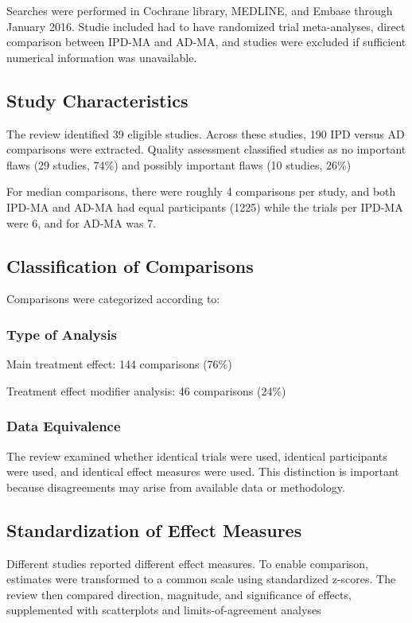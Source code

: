 \documentclass[11pt]{article}
\begin{document}
Searches were performed in Cochrane library, MEDLINE, and Embase through January 2016. Studie included had to have randomized trial meta-analyses, direct comparison between IPD-MA and AD-MA, and studies were excluded if sufficient numerical information was unavailable.

\subsection*{Study Characteristics}

The review identified 39 eligible studies. Across these studies, 190 IPD versus AD comparisons were extracted. Quality assessment classified studies as no important flaws (29 studies, 74\%) and possibly important flaws (10 studies, 26\%)

For median comparisons, there were roughly 4 comparisons per study, and both IPD-MA and AD-MA had equal participants (1225) while the trials per IPD-MA were 6, and for AD-MA was 7.

\subsection*{Classification of Comparisons}

Comparisons were categorized according to:

\subsubsection*{Type of Analysis}

Main treatment effect: 144 comparisons (76\%)

Treatment effect modifier analysis: 46 comparisons (24\%)

\subsubsection*{Data Equivalence}

The review examined whether identical trials were used, identical participants were used, and identical effect measures were used. This distinction is important because disagreements may arise from available data or methodology.

\subsection*{Standardization of Effect Measures}

Different studies reported different effect measures. To enable comparison, estimates were transformed to a common scale using standardized z-scores. The review then compared direction, magnitude, and significance of effects, supplemented with scatterplots and limits-of-agreement analyses
\end{document}
